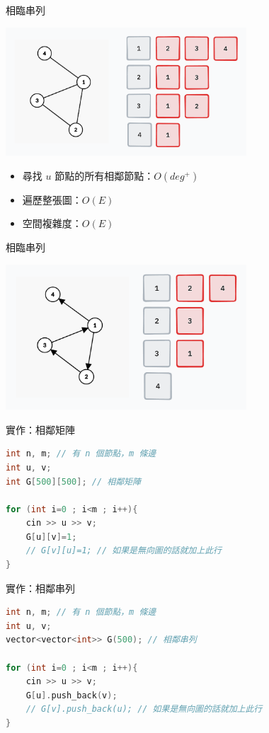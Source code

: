 \documentclass[mathserif]{beamer}
\begin{document}
\begin{frame}{相臨串列}
    \begin{center}
        \includegraphics[width=9.0cm]{img/graph-3.png}
    \end{center}
    \begin{itemize}
        \item 尋找 $u$ 節點的所有相鄰節點：$O(deg^+)$
        \item 遍歷整張圖：$O(E)$
        \item 空間複雜度：$O(E)$
    \end{itemize}
\end{frame}

\begin{frame}{相臨串列}
    \begin{center}
        \includegraphics[width=9.0cm]{img/graph-4.png}
    \end{center}
\end{frame}

\begin{frame}[fragile]{實作：相鄰矩陣}
\begin{lstlisting}[language=C++, caption={}]
int n, m; // 有 n 個節點，m 條邊
int u, v;
int G[500][500]; // 相鄰矩陣

for (int i=0 ; i<m ; i++){
    cin >> u >> v;
    G[u][v]=1;
    // G[v][u]=1; // 如果是無向圖的話就加上此行
}
    \end{lstlisting}
\end{frame}

\begin{frame}[fragile]{實作：相鄰串列}
    \begin{lstlisting}[language=C++, caption={}]
int n, m; // 有 n 個節點，m 條邊
int u, v;
vector<vector<int>> G(500); // 相鄰串列

for (int i=0 ; i<m ; i++){
    cin >> u >> v;
    G[u].push_back(v);
    // G[v].push_back(u); // 如果是無向圖的話就加上此行
}
\end{lstlisting}
\end{frame}
\end{document}

